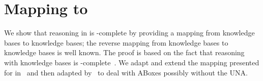 \documentclass[envcountsame,draft]{llncs}
\newcommand{\nb}[1]{\textcolor{red}{\textdagger}\marginpar{\scriptsize\raggedright\textcolor{red}{#1}}}
\newcommand{\Int}[1]{#1^{\Imc}\xspace}
\newcommand{\per}{\mathpunct{\mbox{\bf .}}}
\begin{document}

\section{Mapping \DLRpm to \ALCQI}
\label{sec:mapping}

We show that reasoning in \DLRpm is \ExpTime-complete by providing a
mapping from \DLRpm knowledge bases to \ALCQI knowledge bases; the
reverse mapping from \ALCQI knowledge bases to \DLR knowledge bases is
well known. The proof is based on the fact that reasoning with \ALCQI
knowledge bases is \ExpTime-complete~\cite{BCMNP03}. We adapt and
extend the mapping presented for \DLR in~\cite{calvanese:et:al:98b}
and\nb{A: added} then adapted by~\cite{HorrocksSTT00} to deal with
ABoxes possibly without the UNA.

\end{document}
